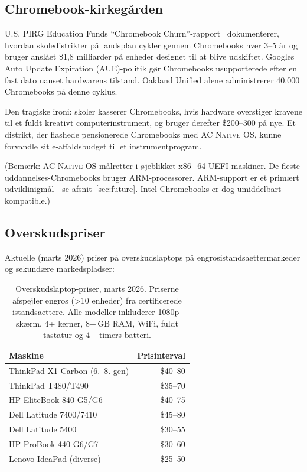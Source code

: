 \documentclass[10pt,letterpaper,twocolumn]{article}
\newcommand{\acos}{\textsc{AC Native OS}}
\begin{document}
\subsection{Chromebook-kirkeg{\aa}rden}

U.S. PIRG Education Funds ``Chromebook Churn''-rapport~\citep{pirg2023chromebook} dokumenterer, hvordan skoledistrikter p{\aa} landsplan cykler gennem Chromebooks hver 3--5 {\aa}r og bruger ansl{\aa}et \$1,8 milliarder p{\aa} enheder designet til at blive udskiftet. Googles Auto Update Expiration (AUE)-politik g{\o}r Chromebooks usupporterede efter en fast dato uanset hardwarens tilstand. Oakland Unified alene administrerer 40.000 Chromebooks p{\aa} denne cyklus.

Den tragiske ironi: skoler kasserer Chromebooks, hvis hardware overstiger kravene til et fuldt kreativt computerinstrument, og bruger derefter \$200--300 p{\aa} nye. Et distrikt, der flashede pensionerede Chromebooks med \acos{}, kunne forvandle sit e-affaldsbudget til et instrumentprogram.

(Bem{\ae}rk: \acos{} m{\aa}lretter i {\o}jeblikket x86\_64 UEFI-maskiner. De fleste uddannelses-Chromebooks bruger ARM-processorer. ARM-support er et prim{\ae}rt udviklinigm{\aa}l---se afsnit~\ref{sec:future}. Intel-Chromebooks er dog umiddelbart kompatible.)

\subsection{Overskudspriser}

Aktuelle (marts 2026) priser p{\aa} overskudslaptops p{\aa} engrosistandsaettermarkeder og sekund{\ae}re markedspladser:

\begin{table}[h]
\small
\centering
\begin{tabular}{lr}
\toprule
\textbf{Maskine} & \textbf{Prisinterval} \\
\midrule
ThinkPad X1 Carbon (6.--8. gen) & \$40--80 \\
ThinkPad T480/T490 & \$35--70 \\
HP EliteBook 840 G5/G6 & \$40--75 \\
Dell Latitude 7400/7410 & \$45--80 \\
Dell Latitude 5400 & \$30--55 \\
HP ProBook 440 G6/G7 & \$30--60 \\
Lenovo IdeaPad (diverse) & \$25--50 \\
\bottomrule
\end{tabular}
\caption{Overskudslaptop-priser, marts 2026. Priserne afspejler engros (\textgreater 10 enheder) fra certificerede istandsaettere. Alle modeller inkluderer 1080p-sk{\ae}rm, 4+ kerner, 8+\,GB RAM, WiFi, fuldt tastatur og 4+ timers batteri.}
\label{tab:surplus}
\end{table}
\end{document}
